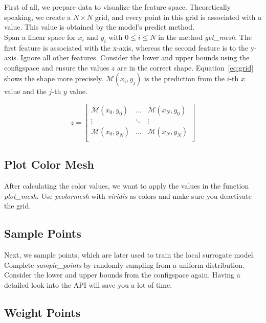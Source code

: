 \documentclass[a4paper]{article}
\begin{document}
\noindent First of all, we prepare data to visualize the feature space. Theoretically speaking, we create a $N\times N$ grid, and every point in this grid is associated with a value. This value is obtained by the model's predict method.\\

\noindent Span a linear space for $x_i$ and $y_i$ with $0 \leq i \leq N$ in the method \textit{get\_mesh}. The first feature is associated with the x-axis, whereas the second feature is to the y-axis. Ignore all other features. Consider the lower and upper bounds using the configspace and ensure the values $z$ are in the correct shape. Equation~\ref{eq:grid} shows the shape more precisely. $\mathcal{M}(x_i, y_j)$ is the prediction from the $i$-th $x$ value and the $j$-th $y$ value. 

\begin{equation}
z
=
\begin{bmatrix}
\mathcal{M}(x_0, y_0) & \dots & \mathcal{M}(x_N, y_0)\\
\vdots & \ddots & \vdots\\
\mathcal{M}(x_0, y_N) & \dots & \mathcal{M}(x_N, y_N)\\
\end{bmatrix}
\label{eq:grid}
\end{equation}


\subsection{Plot Color Mesh}

After calculating the color values, we want to apply the values in the function \textit{plot\_mesh}. Use \textit{pcolormesh} with \textit{viridis} as colors and make sure you deactivate the grid.


\subsection{Sample Points}

Next, we sample points, which are later used to train the local surrogate model. Complete
\textit{sample\_points} by randomly sampling from a uniform distribution. Consider the lower and
upper bounds from the configspace again. Having a detailed look into the API will save you a lot of time.


\subsection{Weight Points}
\end{document}
